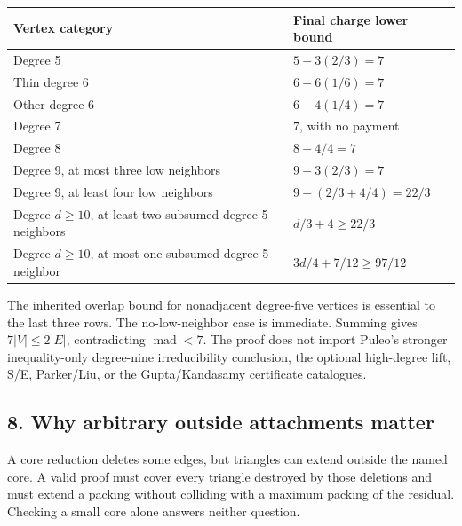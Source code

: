\documentclass[11pt,a4paper]{article}
\begin{document}
{\def\LTcaptype{none} %
\begin{longtable}[]{@{}
  >{\raggedright\arraybackslash}p{}
  >{\raggedright\arraybackslash}p{}@{}}
\toprule\noalign{}
\begin{minipage}[b]{\linewidth}\raggedright
Vertex category
\end{minipage} & \begin{minipage}[b]{\linewidth}\raggedright
Final charge lower bound
\end{minipage} \\
\midrule\noalign{}
\endhead
\bottomrule\noalign{}
\endlastfoot
Degree 5 & \(5+3(2/3)=7\) \\
Thin degree 6 & \(6+6(1/6)=7\) \\
Other degree 6 & \(6+4(1/4)=7\) \\
Degree 7 & \(7\), with no payment \\
Degree 8 & \(8-4/4=7\) \\
Degree 9, at most three low neighbors & \(9-3(2/3)=7\) \\
Degree 9, at least four low neighbors & \(9-(2/3+4/4)=22/3\) \\
Degree \(d\ge10\), at least two subsumed degree-5 neighbors & \(d/3+4\ge22/3\) \\
Degree \(d\ge10\), at most one subsumed degree-5 neighbor & \(3d/4+7/12\ge97/12\) \\
\end{longtable}
}

The inherited overlap bound for nonadjacent degree-five vertices is essential to the last three rows. The no-low-neighbor case is immediate. Summing gives \(7|V|\le2|E|\), contradicting \(\operatorname{mad}<7\). The proof does not import Puleo's stronger inequality-only degree-nine irreducibility conclusion, the optional high-degree lift, S/E, Parker/Liu, or the Gupta/Kandasamy certificate catalogues.

\subsection{8. Why arbitrary outside attachments matter}\label{why-arbitrary-outside-attachments-matter}

A core reduction deletes some edges, but triangles can extend outside the named core. A valid proof must cover every triangle destroyed by those deletions and must extend a packing without colliding with a maximum packing of the residual. Checking a small core alone answers neither question.
\end{document}
